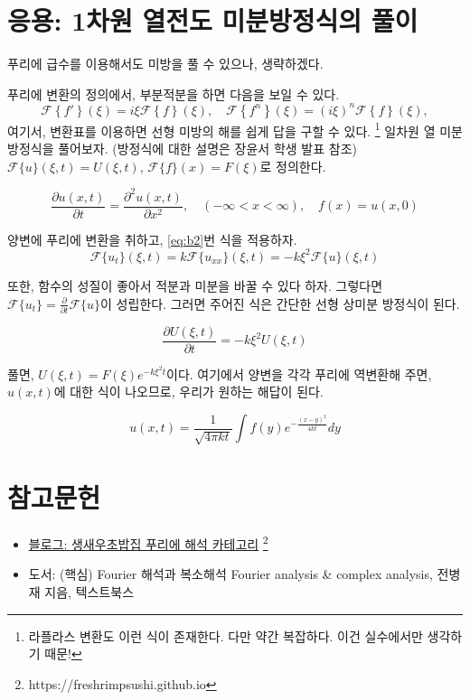 \documentclass[article, oneside]{oblivoir}
\begin{document}
\section{응용: 1차원 열전도 미분방정식의 풀이}
푸리에 급수를 이용해서도 미방을 풀 수 있으나, 생략하겠다.

푸리에 변환의 정의에서, 부분적분을 하면 다음을 보일 수 있다.
\begin{equation}
    \mathcal{F}\left\{f' \right\} (\xi) = i \xi \mathcal{F}\left\{f \right\} (\xi), \quad \mathcal{F}\left\{f^n \right\} (\xi) = \left(i \xi\right)^n \mathcal{F}\left\{f \right\} (\xi), \label{eq:b2}
\end{equation}
여기서, 변환표를 이용하면 선형 미방의 해를 쉽게 답을 구할 수 있다.
\footnote{라플라스 변환도 이런 식이 존재한다. 다만 약간 복잡하다. 이건 실수에서만 생각하기 때문!}
일차원 열 미분방정식을 풀어보자. (방정식에 대한 설명은 장윤서 학생 발표 참조)
$\mathcal{F}\{u\}(\xi, t) = U(\xi, t)$, $\mathcal{F}\{f\}(x) = F(\xi)$로 정의한다.

$$\frac{\partial u(x,t)}{\partial t} = \frac{\partial^2 u(x,t)}{\partial x^2}, \quad (-\infty < x < \infty), \quad f(x) = u(x,0) $$

양변에 푸리에 변환을 취하고, \ref{eq:b2}번 식을 적용하자.
$$\mathcal{F}\{u_t\}(\xi, t) = k \mathcal{F}\{u_{xx}\}(\xi, t) =  - k \xi^2 \mathcal{F}\{u\}(\xi, t)$$

또한, 함수의 성질이 좋아서 적분과 미분을 바꿀 수 있다 하자. 그렇다면 $\mathcal{F}\{u_t\} = \frac{\partial}{\partial t}\mathcal{F}\{u\}$이 성립한다. 그러면 주어진 식은 간단한 선형 상미분 방정식이 된다.

$$\frac{\partial U(\xi, t)}{\partial t} = - k \xi^2 U(\xi, t)$$

풀면, $U(\xi, t) = F(\xi) e^{-k \xi ^2 t}$이다. 여기에서 양변을 각각 푸리에 역변환해 주면, $u(x,t)$에 대한 식이 나오므로, 우리가 원하는 해답이 된다.

$$u(x,t) = \frac{1}{\sqrt{4 \pi k t}} \int f(y) e^{-\frac{\left(x-y\right)^2}{4 k t}} dy$$

\section{참고문헌}
\begin{itemize}
    \item \href{https://freshrimpsushi.github.io/}{블로그: 생새우초밥집 \> 푸리에 해석 카테고리} \footnote{https://freshrimpsushi.github.io}
    \item 도서: (핵심) Fourier 해석과 복소해석 Fourier analysis \& complex analysis, 전병재 지음, 텍스트북스
\end{itemize}
\end{document}
